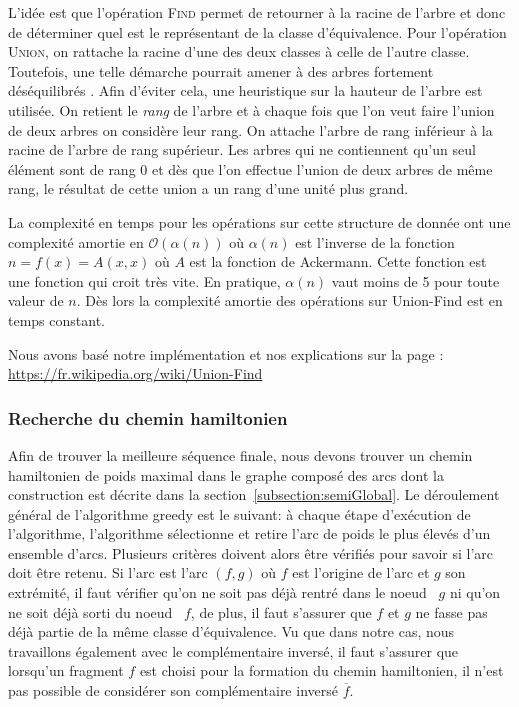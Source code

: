 L'idée est que l'opération \textsc{Find} permet de retourner à la racine de l'arbre et donc de déterminer quel est le représentant de la classe d'équivalence. Pour l'opération \textsc{Union}, on rattache la racine d'une des deux classes à celle de l'autre classe. Toutefois, une telle démarche pourrait amener à des arbres fortement déséquilibrés . Afin d'éviter cela, une heuristique sur la hauteur de l'arbre est utilisée. On retient le \emph{rang} de l'arbre et à chaque fois que l'on veut faire l'union de deux arbres on considère leur rang. On attache l'arbre de rang inférieur à la racine de l'arbre de rang supérieur. Les arbres qui ne contiennent qu'un seul élément sont de rang 0 et dès que l'on effectue l'union de deux arbres de même rang, le résultat de cette union a un rang d'une unité plus grand.

La complexité en temps pour les opérations sur cette structure de donnée ont une complexité amortie en $\mathcal{O}(\alpha (n))$ où $\alpha(n)$ est l'inverse de la fonction $n = f(x) = A(x,x)$ où $A$ est la fonction de Ackermann. Cette fonction est une fonction qui croit très vite. En pratique, $\alpha(n)$ vaut moins de 5 pour toute valeur de $n$. Dès lors la complexité amortie des opérations sur Union-Find est en temps constant.

Nous avons basé notre implémentation et nos explications sur la page : \url{https://fr.wikipedia.org/wiki/Union-Find}
\subsubsection{Recherche du chemin hamiltonien}

Afin de trouver la meilleure séquence finale, nous devons trouver un chemin hamiltonien de poids maximal dans le graphe composé des arcs dont la construction est décrite dans la section~\ref{subsection:semiGlobal}. Le déroulement général de l'algorithme greedy est le suivant: à chaque étape d'exécution de l'algorithme, l'algorithme sélectionne et retire l'arc de poids le plus élevés d'un ensemble d'arcs. Plusieurs critères doivent alors être vérifiés pour savoir si l'arc doit être retenu. Si l'arc est l'arc $(f,g)$ où $f$ est l'origine de l'arc et $g$ son extrémité, il faut vérifier qu'on ne soit pas déjà rentré dans le \og noeud \fg~$g$ ni qu'on ne soit déjà sorti du \og noeud \fg~$f$, de plus, il faut s'assurer que $f$ et $g$ ne fasse pas déjà partie de la même classe d'équivalence. Vu que dans notre cas, nous travaillons également avec le complémentaire inversé, il faut s'assurer que lorsqu'un fragment $f$ est choisi pour la formation du chemin hamiltonien, il n'est pas possible de considérer son complémentaire inversé $\overline{f}$.

